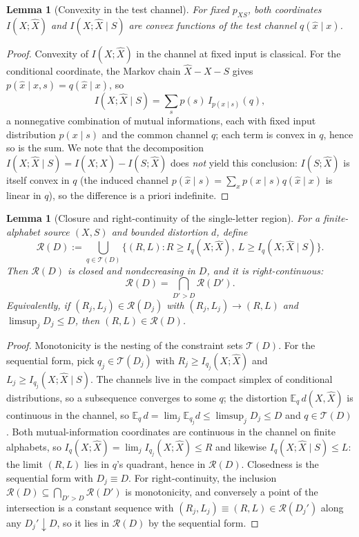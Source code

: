 ﻿\documentclass[11pt,onecolumn]{IEEEtran}
\newtheorem{lemma}[theorem]{Lemma}
\newcommand{\E}{\mathbb{E}}
\newcommand{\hX}{\widehat{X}}
\begin{document}
\begin{lemma}[Convexity in the test channel]\label{lem:convexity}
For fixed $p_{XS}$, both coordinates $I(X;\hX)$ and $I(X;\hX\mid S)$ are
convex functions of the test channel $q(\hat x\mid x)$.
\end{lemma}

\begin{proof}
Convexity of $I(X;\hX)$ in the channel at fixed input is classical. For the
conditional coordinate, the Markov chain $\hX-X-S$ gives
$p(\hat x\mid x,s)=q(\hat x\mid x)$, so
\begin{equation}
 I(X;\hX\mid S)=\sum_s p(s)\,I_{p(x\mid s)}(q),
 \label{eq:per-s-decomposition}
\end{equation}
a nonnegative combination of mutual informations, each with fixed input
distribution $p(x\mid s)$ and the common channel $q$; each term is convex in
$q$, hence so is the sum. We note that the decomposition
$I(X;\hX\mid S)=I(X;\hX)-I(S;\hX)$ does \emph{not} yield this conclusion:
$I(S;\hX)$ is itself convex in $q$ (the induced channel
$p(\hat x\mid s)=\sum_x p(x\mid s)q(\hat x\mid x)$ is linear in $q$), so the
difference is a priori indefinite.
\end{proof}

\begin{lemma}[Closure and right-continuity of the single-letter region]
\label{lem:rightcont}
For a finite-alphabet source $(X,S)$ and bounded distortion $d$, define
\[
\mathcal R(D):=\bigcup_{q\in\mathcal T(D)}
\bigl\{(R,L):R\ge I_q(X;\hX),\ L\ge I_q(X;\hX\mid S)\bigr\}.
\]
Then $\mathcal R(D)$ is closed and nondecreasing in $D$, and it is
right-continuous:
\[
\mathcal R(D)=\bigcap_{D'>D}\mathcal R(D').
\]
Equivalently, if $(R_j,L_j)\in\mathcal R(D_j)$ with
$(R_j,L_j)\to(R,L)$ and $\limsup_jD_j\le D$, then
$(R,L)\in\mathcal R(D)$.
\end{lemma}

\begin{proof}
Monotonicity is the nesting of the constraint sets $\mathcal T(D)$. For
the sequential form, pick $q_j\in\mathcal T(D_j)$ with
$R_j\ge I_{q_j}(X;\hX)$ and $L_j\ge I_{q_j}(X;\hX\mid S)$. The channels
live in the compact simplex of conditional distributions, so a
subsequence converges to some $q$; the distortion $\E_q\,d(X,\hX)$ is
continuous in the channel, so
$\E_q\,d=\lim_j\E_{q_j}d\le\limsup_jD_j\le D$ and $q\in\mathcal T(D)$.
Both mutual-information coordinates are continuous in the channel on
finite alphabets, so $I_q(X;\hX)=\lim_jI_{q_j}(X;\hX)\le R$ and
likewise $I_q(X;\hX\mid S)\le L$: the limit $(R,L)$ lies in $q$'s
quadrant, hence in $\mathcal R(D)$. Closedness is the sequential form
with $D_j\equiv D$. For right-continuity, the inclusion
$\mathcal R(D)\subseteq\bigcap_{D'>D}\mathcal R(D')$ is monotonicity,
and conversely a point of the intersection is a constant sequence with
$(R_j,L_j)\equiv(R,L)\in\mathcal R(D_j')$ along any $D_j'\downarrow D$,
so it lies in $\mathcal R(D)$ by the sequential form.
\end{proof}
\end{document}
